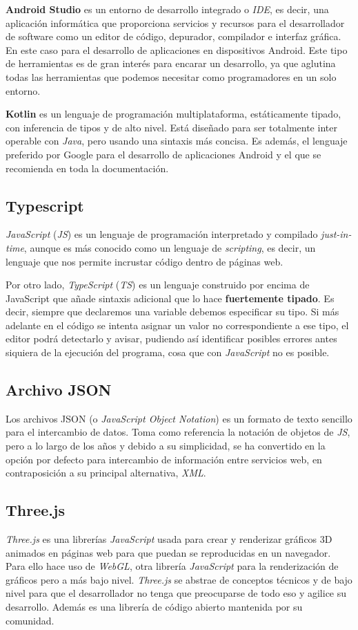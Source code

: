\textbf{Android Studio} es un entorno de desarrollo integrado o \textit{IDE}, es decir, una aplicación informática que proporciona servicios y recursos para el desarrollador de software como un editor de código, depurador, compilador e interfaz gráfica. En este caso para el desarrollo de aplicaciones en dispositivos Android. Este tipo de herramientas es de gran interés para encarar un desarrollo, ya que aglutina todas las herramientas que podemos necesitar como programadores en un solo entorno.

\textbf{Kotlin}  es un lenguaje de programación multiplataforma, estáticamente tipado, con inferencia de tipos y de alto nivel. Está diseñado para ser totalmente inter operable con \textit{Java}, pero usando una sintaxis más concisa. Es además, el lenguaje preferido por Google para el desarrollo de aplicaciones Android y el que se recomienda en toda la documentación.

\subsection{Typescript}
\textit{JavaScript} (\textit{JS}) es un lenguaje de programación interpretado y compilado \textit{just-in-time}, aunque es más conocido como un lenguaje de \textit{scripting}, es decir, un lenguaje que nos permite incrustar código dentro de páginas web.

Por otro lado, \textit{TypeScript} (\textit{TS}) es un lenguaje construido por encima de JavaScript que añade sintaxis adicional que lo hace \textbf{fuertemente tipado}. Es decir, siempre que declaremos una variable debemos especificar su tipo. Si más adelante en el código se intenta asignar un valor no correspondiente a ese tipo, el editor podrá detectarlo y avisar, pudiendo así identificar posibles errores antes siquiera de la ejecución del programa, cosa que con \textit{JavaScript} no es posible.

\subsection{Archivo JSON}
Los archivos JSON (o \textit{JavaScript Object Notation}) es un formato de texto sencillo para el intercambio de datos. Toma como referencia la notación de objetos de \textit{JS}, pero a lo largo de los años y debido a su simplicidad, se ha convertido en la opción por defecto para intercambio de información entre servicios web, en contraposición a su principal alternativa, \textit{XML}.

\subsection{Three.js}
\textit{Three.js}\cite{three} es una librerías \textit{JavaScript} usada para crear y renderizar gráficos 3D animados en páginas web para que puedan se reproducidas en un navegador. Para ello hace uso de \textit{WebGL}, otra librería \textit{JavaScript} para la renderización de gráficos pero a más bajo nivel. \textit{Three.js} se abstrae de conceptos técnicos y de bajo nivel para que el desarrollador no tenga que preocuparse de todo eso y agilice su desarrollo. Además es una librería de código abierto mantenida por su comunidad.

